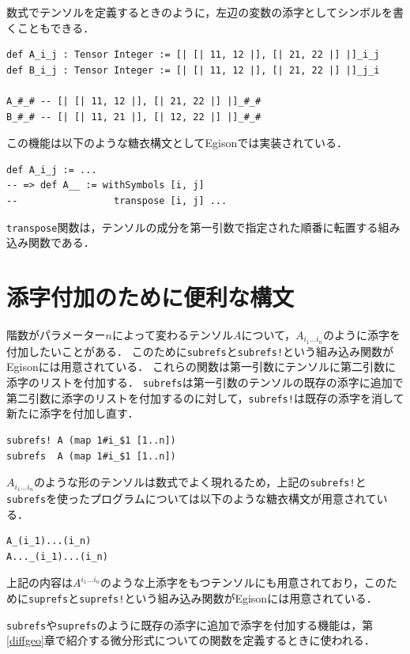 数式でテンソルを定義するときのように，左辺の変数の添字としてシンボルを書くこともできる．
\begin{lstlisting}[language=egison,numbers=none]
def A_i_j : Tensor Integer := [| [| 11, 12 |], [| 21, 22 |] |]_i_j
def B_i_j : Tensor Integer := [| [| 11, 12 |], [| 21, 22 |] |]_j_i

A_#_# -- [| [| 11, 12 |], [| 21, 22 |] |]_#_#
B_#_# -- [| [| 11, 21 |], [| 12, 22 |] |]_#_#
\end{lstlisting}
この機能は以下のような糖衣構文としてEgisonでは実装されている．
\begin{lstlisting}[language=egison,numbers=none]
def A_i_j := ...
-- => def A__ := withSymbols [i, j]
--                 transpose [i, j] ...
\end{lstlisting}
\lstinline{transpose}関数は，テンソルの成分を第一引数で指定された順番に転置する組み込み関数である．

\section{添字付加のために便利な構文}\label{tensor-refs}

階数がパラメーター$n$によって変わるテンソル$A$について，$A_{i_{1}...i_{n}}$のように添字を付加したいことがある．
このために\lstinline{subrefs}と\lstinline{subrefs!}という組み込み関数がEgisonには用意されている．
これらの関数は第一引数にテンソルに第二引数に添字のリストを付加する．
\lstinline{subrefs}は第一引数のテンソルの既存の添字に追加で第二引数に添字のリストを付加するのに対して，\lstinline{subrefs!}は既存の添字を消して新たに添字を付加し直す．
\begin{lstlisting}[language=egison,numbers=none]
subrefs! A (map 1#i_$1 [1..n])
subrefs  A (map 1#i_$1 [1..n])
\end{lstlisting}
$A_{i_{1}...i_{n}}$のような形のテンソルは数式でよく現れるため，上記の\lstinline{subrefs!}と\lstinline{subrefs}を使ったプログラムについては以下のような糖衣構文が用意されている．
\begin{lstlisting}[language=egison,numbers=none]
A_(i_1)...(i_n)
A..._(i_1)...(i_n)
\end{lstlisting}
上記の内容は$A^{i_{1}...i_{n}}$のような上添字をもつテンソルにも用意されており，このために\lstinline{suprefs}と\lstinline{suprefs!}という組み込み関数がEgisonには用意されている．

\lstinline{subrefs}や\lstinline{suprefs}のように既存の添字に追加で添字を付加する機能は，第\ref{diffgeo}章で紹介する微分形式についての関数を定義するときに使われる．

